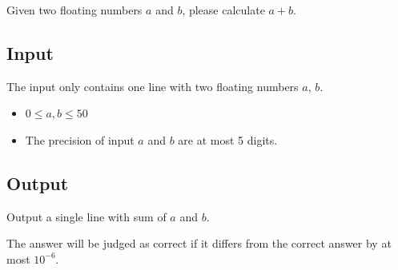 
Given two floating numbers $a$ and $b$, please calculate $a+b$.

\subsection*{Input}

The input only contains one line with two floating numbers $a$, $b$.

\begin{itemize}
    \item $0 \leq a, b \leq 50$
    \item The precision of input $a$ and $b$ are at most 5 digits.
\end{itemize}

\subsection*{Output}

Output a single line with sum of $a$ and $b$.

The answer will be judged as correct if it differs from the correct answer by at most $10^{-6}$.
